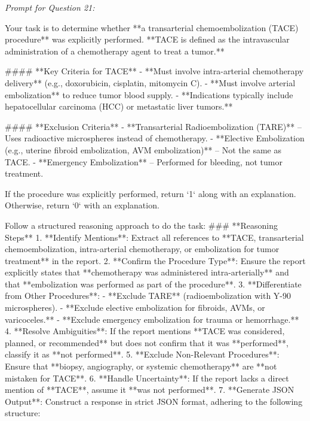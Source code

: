 \textit{\normalsize Prompt for Question  21:}
\begin{mdframed}[]
\normalsize

Your task is to determine whether **a transarterial chemoembolization (TACE) procedure** was explicitly performed. **TACE is defined as the intravascular administration of a chemotherapy agent to treat a tumor.**  

#### **Key Criteria for TACE**  
- **Must involve intra-arterial chemotherapy delivery** (e.g., doxorubicin, cisplatin, mitomycin C).  
- **Must involve arterial embolization** to reduce tumor blood supply.  
- **Indications typically include hepatocellular carcinoma (HCC) or metastatic liver tumors.**  

#### **Exclusion Criteria**  
- **Transarterial Radioembolization (TARE)** – Uses radioactive microspheres instead of chemotherapy.  
- **Elective Embolization (e.g., uterine fibroid embolization, AVM embolization)** – Not the same as TACE.  
- **Emergency Embolization** – Performed for bleeding, not tumor treatment.  

If the procedure was explicitly performed, return `1` along with an explanation. Otherwise, return `0` with an explanation.

Follow a structured reasoning approach to do the task:
### **Reasoning Steps**  
1. **Identify Mentions**: Extract all references to **TACE, transarterial chemoembolization, intra-arterial chemotherapy, or embolization for tumor treatment** in the report.  
2. **Confirm the Procedure Type**: Ensure the report explicitly states that **chemotherapy was administered intra-arterially** and that **embolization was performed as part of the procedure**.  
3. **Differentiate from Other Procedures**:  
   - **Exclude TARE** (radioembolization with Y-90 microspheres).  
   - **Exclude elective embolization for fibroids, AVMs, or varicoceles.**  
   - **Exclude emergency embolization for trauma or hemorrhage.**  
4. **Resolve Ambiguities**: If the report mentions **TACE was considered, planned, or recommended** but does not confirm that it was **performed**, classify it as **not performed**.  
5. **Exclude Non-Relevant Procedures**: Ensure that **biopsy, angiography, or systemic chemotherapy** are **not mistaken for TACE**.  
6. **Handle Uncertainty**: If the report lacks a direct mention of **TACE**, assume it **was not performed**.  
7. **Generate JSON Output**: Construct a response in strict JSON format, adhering to the following structure:  

\end{mdframed}

